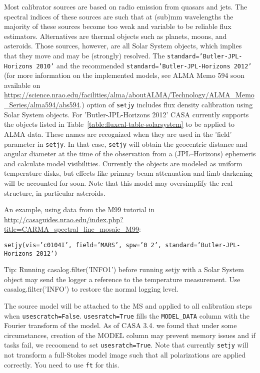 Most calibrator sources are based on radio emission from quasars and
jets. The spectral indices of these sources are such that at (sub)mm
wavelengths the majority of these sources become too weak and variable
to be reliable flux estimators. Alternatives are thermal objects such
as planets, moons, and asteroids. Those sources, however, are all
Solar System objects, which implies that they move and may be
(strongly) resolved. The {\tt standard='Butler-JPL-Horizons 2010'} and
the recommended {\tt standard='Butler-JPL-Horizons 2012'} (for more
information on the implemented models, see ALMA Memo 594 soon
available on
\url{https://science.nrao.edu/facilities/alma/aboutALMA/Technology/ALMA_Memo_Series/alma594/abs594}.)
option of {\tt setjy} includes flux density calibration using Solar
System objects. For 'Butler-JPL-Horizons 2012' CASA currently supports
the objects listed in Table~\ref{table:fluxcal-table-solarsystem} to
be applied to ALMA data. These names are recognized when they are used
in the 'field' parameter in {\tt setjy}.  In that case, {\tt setjy}
will obtain the geocentric distance and angular diameter at the time
of the observation from a (JPL--Horizons) ephemeris and calculate
model visibilities.  Currently the objects are modeled as uniform
temperature disks, but effects like primary beam attenuation and limb
darkening will be accounted for soon. Note that this model may
oversimplify the real structure, in particular asteroids.

An example, using data from the M99 tutorial in 
\url{http://casaguides.nrao.edu/index.php?title=CARMA_spectral_line_mosaic_M99}:

{\tt setjy(vis='c0104I', field='MARS', spw='0~2', standard='Butler-JPL-Horizons 2012')}

Tip: Running casalog.filter('INFO1') before running setjy with a Solar
System object may send the logger a reference to the temperature
measurement.  Use casalog.filter('INFO') to restore the normal logging
level.

The source model will be attached to the MS and applied to all
calibration steps when {\tt usescratch=False}. {\tt usesratch=True}
  fills the {\tt MODEL\_DATA} column with the Fourier transform of the
  model. As of CASA 3.4. we found that under some circumstances,
  creation of the MODEL column may prevent memory issues and if tasks
  fail, we recoomend to set {\tt usesratch=True}. Note that currently
  {\tt setjy} will not transform a full-Stokes model image such that
  all polarizations are applied correctly.  You need to use {\tt ft}
  for this.


